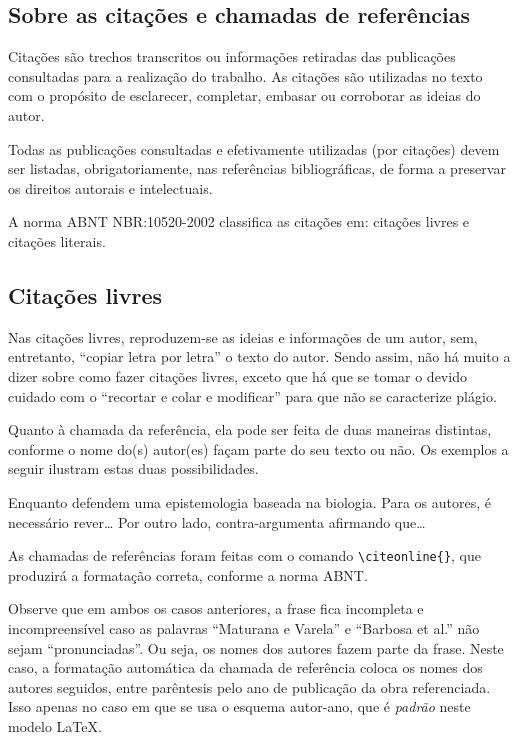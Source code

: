 \begin{apendicesenv}
    \chapter{Sobre as citações e chamadas de referências}
    \label{chap_sobre_as_citacoes}

    Citações são trechos transcritos ou informações retiradas das publicações consultadas para a realização do trabalho.
    As citações são utilizadas no texto com o propósito de esclarecer, completar, embasar ou corroborar as ideias do autor.

    Todas as publicações consultadas e efetivamente utilizadas (por citações) devem ser listadas, obrigatoriamente, nas referências bibliográficas, de forma a preservar os direitos autorais e intelectuais.

    A norma ABNT NBR:10520-2002 classifica as citações em: citações livres e citações literais.

    \section{Citações livres}
    \label{sec_citacoes_livres}

    Nas citações livres, reproduzem-se as ideias e informações de um autor, sem, entretanto, ``copiar letra por letra'' o texto do autor.
    Sendo assim, não há muito a dizer sobre como fazer citações livres, exceto que há que se tomar o devido cuidado com o ``recortar e colar e modificar'' para que não se caracterize plágio.

    Quanto à chamada da referência, ela pode ser feita de duas maneiras distintas, conforme o nome do(s) autor(es) façam parte do seu texto ou não.
    Os exemplos a seguir ilustram estas duas possibilidades.

    Enquanto  defendem uma epistemologia baseada na biologia.
    Para os autores, é necessário rever\ldots
    Por outro lado,  contra-argumenta afirmando que\ldots

    As chamadas de referências foram feitas com o comando \verb|\citeonline{}|, que produzirá a formatação correta, conforme a norma ABNT.

    Observe que em ambos os casos anteriores, a frase fica incompleta e incompreensível caso as palavras ``Maturana e Varela'' e ``Barbosa et al.'' não sejam ``pronunciadas''.
    Ou seja, os nomes dos autores fazem parte da frase.
    Neste caso, a formatação automática da chamada de referência coloca os nomes dos autores seguidos, entre parêntesis pelo ano de publicação da obra referenciada.
    Isso apenas no caso em que se usa o esquema autor-ano, que é \textit{padrão} neste modelo \LaTeX{}.


\end{apendicesenv}
